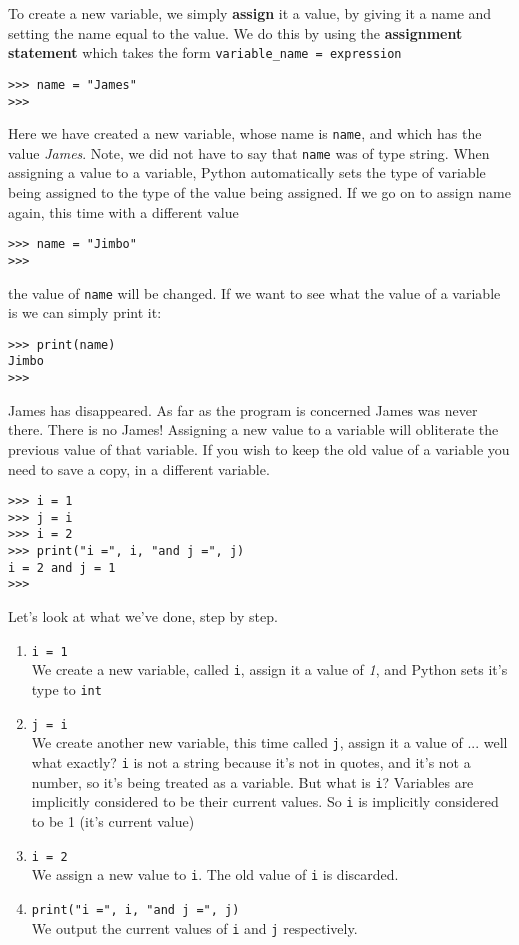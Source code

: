 To create a new variable, we simply \textbf{assign}   it a value, by giving it a name and setting the name equal to the   value. We do this by using the \textbf{assignment statement}   which takes the form \texttt{variable\_name = expression}
\begin{lstlisting}
>>> name = "James"
>>>
\end{lstlisting}

Here we have created a new variable, whose name is \texttt{name}, and which   has the value \textit{James}. Note, we did not have to say that \texttt{name} was of type string.   When assigning a value to a variable, Python automatically sets the type of   variable being assigned to the type of the value being assigned. If we   go on to assign name again, this time with a different value
\begin{lstlisting}
>>> name = "Jimbo"
>>>
\end{lstlisting}

the value of \texttt{name} will be changed. If we want to see what the value of   a variable is we can simply print it:
\begin{lstlisting}
>>> print(name)
Jimbo
>>>
\end{lstlisting}

James has disappeared. As far as the program is concerned James was   never there. There is no James! Assigning a new value to a variable   will obliterate the previous value of that variable. If you wish to   keep the old value of a variable you need to save a copy, in a   different variable.
\begin{lstlisting}
>>> i = 1
>>> j = i
>>> i = 2
>>> print("i =", i, "and j =", j)
i = 2 and j = 1
>>>
\end{lstlisting}

Let's look at what we've done, step by step.
\begin{enumerate}
	\item 
\texttt{i = 1}
\\     We create a new variable, called \texttt{i}, assign it a value of    \textit{1}, and Python sets it's type to \texttt{int}
	\item 
\texttt{j = i}
\\     We create another new variable, this time called \texttt{j}, assign it a    value of ... well what exactly? 
\texttt{i} is not a string    because it's not in quotes, and it's not a number, so it's being    treated as a variable. But what is \texttt{i}? Variables are implicitly    considered to be their current values. So 
\texttt{i} is    implicitly considered to be 1 (it's current value)
	\item 
\texttt{i = 2}
\\     We assign a new value to \texttt{i}. The old value of \texttt{i} is    discarded.
	\item 
\texttt{print("i =", i, "and j =", j)}
\\     We output the current values of \texttt{i} and \texttt{j} respectively.
\end{enumerate}

